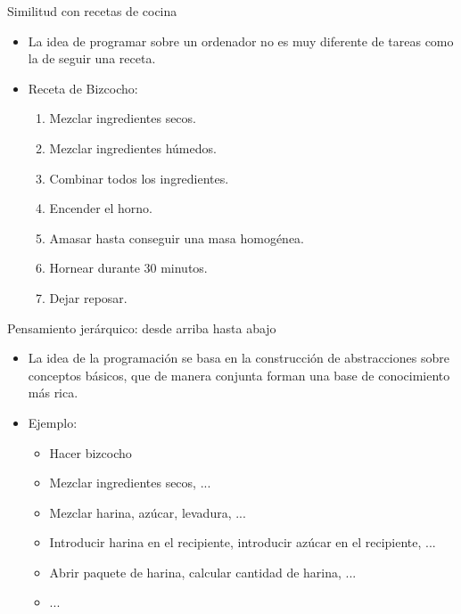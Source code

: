 \documentclass{beamer}
\begin{document}
    \begin{frame}{Similitud con recetas de cocina}
        \noindent
        \begin{minipage}{.29\textwidth}
          \begin{center}
            \fontsize{40}{50}
          \end{center}
        \end{minipage}
        \begin{minipage}{.69\textwidth}
            \begin{itemize}
                \item La idea de programar sobre un ordenador no es muy diferente de tareas como la de seguir una receta.
                \item Receta de Bizcocho:
                \begin{enumerate}
                    \item Mezclar ingredientes secos.
                    \item Mezclar ingredientes húmedos.
                    \item Combinar todos los ingredientes.
                    \item Encender el horno.
                    \item Amasar hasta conseguir una masa homogénea.
                    \item Hornear durante 30 minutos.
                    \item Dejar reposar.
                \end{enumerate}
            \end{itemize}
        \end{minipage}
    \end{frame}

    \begin{frame}{Pensamiento jerárquico: desde arriba hasta abajo}
        \begin{itemize}
          \item La idea de la programación se basa en la construcción de abstracciones sobre conceptos básicos, que de manera conjunta forman una base de conocimiento más rica.
          \item Ejemplo:
          \begin{itemize}
            \item Hacer bizcocho
            \item Mezclar ingredientes secos, ...
            \item Mezclar harina, azúcar, levadura, ...
            \item Introducir harina en el recipiente, introducir azúcar en el recipiente, ...
            \item Abrir paquete de harina, calcular cantidad de harina, ...
            \item ...
          \end{itemize}
        \end{itemize}
    \end{frame}
\end{document}
